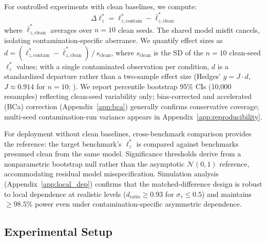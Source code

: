 For controlled experiments with clean baselines, we compute:
\begin{equation}
  \Delta\ell_z^* = \ell_{z,\text{contam}}^{*} - \bar{\ell}_{z,\text{clean}}^{*}
  \label{eq:delta_lz}
\end{equation}
where $\bar{\ell}_{z,\text{clean}}^{*}$ averages over $n{=}10$ clean seeds.
The shared model misfit cancels, isolating contamination-specific aberrance.
We quantify effect sizes as $d = (\ell_{z,\text{contam}}^{*} - \bar{\ell}_{z,\text{clean}}^{*})\,/\,s_{\text{clean}}$, where $s_{\text{clean}}$ is the SD of the $n{=}10$ clean-seed $\ell_z^*$ values; with a single contaminated observation per condition, $d$ is a standardized departure rather than a two-sample effect size (Hedges' $g = J \cdot d$, $J \approx 0.914$ for $n{=}10$; \citealp{hedges1981}).
We report percentile bootstrap 95\% CIs (10,000 resamples) reflecting clean-seed variability only; bias-corrected and accelerated (BCa) correction (Appendix~\ref{app:bca}) generally confirms conservative coverage; multi-seed contamination-run variance appears in Appendix~\ref{app:reproducibility}.

For deployment without clean baselines, cross-benchmark comparison provides the reference: the target benchmark's $\ell_z^*$ is compared against benchmarks presumed clean from the same model.
Significance thresholds derive from a nonparametric bootstrap null rather than the asymptotic $\mathcal{N}(0,1)$ reference, accommodating residual model misspecification.
Simulation analysis (Appendix~\ref{app:local_dep}) confirms that the matched-difference design is robust to local dependence at realistic levels ($d_{\text{ratio}} \geq 0.93$ for $\sigma_\tau \leq 0.5$) and maintains ${\geq}98.5\%$ power even under contamination-specific asymmetric dependence.

\subsection{Experimental Setup}
\label{sec:setup}

